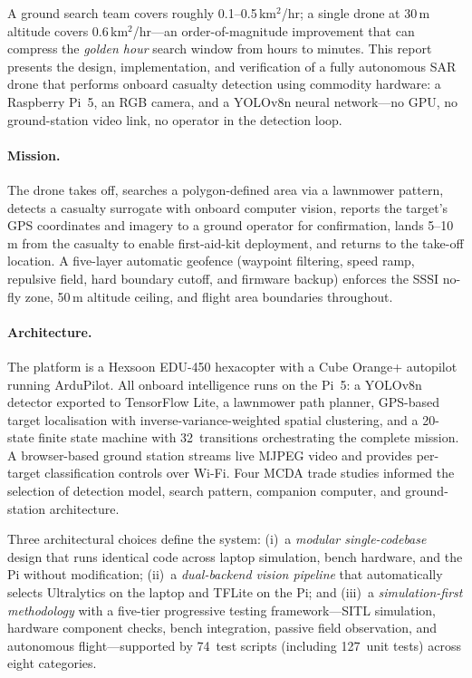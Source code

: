 
A ground search team covers roughly 0.1--0.5\,km$^{2}$/hr; a single drone at 30\,m altitude covers 0.6\,km$^{2}$/hr---an order-of-magnitude improvement that can compress the \emph{golden hour} search window from hours to minutes. This report presents the design, implementation, and verification of a fully autonomous SAR drone that performs onboard casualty detection using commodity hardware: a Raspberry Pi~5, an RGB camera, and a YOLOv8n neural network---no GPU, no ground-station video link, no operator in the detection loop.

\paragraph{Mission.}
The drone takes off, searches a polygon-defined area via a lawnmower pattern, detects a casualty surrogate with onboard computer vision, reports the target's GPS coordinates and imagery to a ground operator for confirmation, lands 5--10\,m from the casualty to enable first-aid-kit deployment, and returns to the take-off location. A five-layer automatic geofence (waypoint filtering, speed ramp, repulsive field, hard boundary cutoff, and firmware backup) enforces the SSSI no-fly zone, 50\,m altitude ceiling, and flight area boundaries throughout.

\paragraph{Architecture.}
The platform is a Hexsoon EDU-450 hexacopter with a Cube Orange+ autopilot running ArduPilot. All onboard intelligence runs on the Pi~5: a YOLOv8n detector exported to TensorFlow Lite, a lawnmower path planner, GPS-based target localisation with inverse-variance-weighted spatial clustering, and a 20-state finite state machine with 32~transitions orchestrating the complete mission. A browser-based ground station streams live MJPEG video and provides per-target classification controls over Wi-Fi. Four MCDA trade studies informed the selection of detection model, search pattern, companion computer, and ground-station architecture.

Three architectural choices define the system: (i)~a \emph{modular single-codebase} design that runs identical code across laptop simulation, bench hardware, and the Pi without modification; (ii)~a \emph{dual-backend vision pipeline} that automatically selects Ultralytics on the laptop and TFLite on the Pi; and (iii)~a \emph{simulation-first methodology} with a five-tier progressive testing framework---SITL simulation, hardware component checks, bench integration, passive field observation, and autonomous flight---supported by 74~test scripts (including 127~unit tests) across eight categories.

